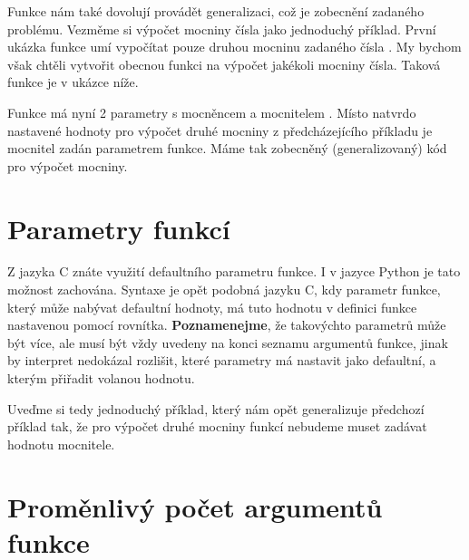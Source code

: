 Funkce nám také dovolují provádět generalizaci, což je zobecnění zadaného problému.
Vezměme si výpočet mocniny čísla jako jednoduchý příklad. První ukázka funkce  umí
vypočítat pouze druhou mocninu zadaného čísla . My bychom však chtěli vytvořit obecnou
funkci na výpočet jakékoli mocniny čísla. Taková funkce je v ukázce níže.


Funkce  má nyní 2 parametry s mocněncem  a mocnitelem . Místo
natvrdo nastavené hodnoty  pro výpočet druhé mocniny z předcházejícího příkladu je mocnitel
zadán parametrem funkce. Máme tak zobecněný (generalizovaný) kód pro výpočet mocniny.

\section{Parametry funkcí}

Z jazyka C znáte využití defaultního parametru funkce. I v jazyce Python je tato možnost zachována.
Syntaxe je opět podobná jazyku C, kdy parametr funkce, který může nabývat defaultní hodnoty, má
tuto hodnotu v definici funkce nastavenou pomocí rovnítka.
\textbf{Poznamenejme}, že takovýchto parametrů
může být více, ale musí být vždy uvedeny na konci seznamu argumentů funkce, jinak by interpret
nedokázal rozlišit, které parametry má nastavit jako defaultní, a kterým přiřadit volanou hodnotu.

Uveďme si tedy jednoduchý příklad, který nám opět generalizuje předchozí příklad tak, že pro výpočet
druhé mocniny funkcí  nebudeme muset zadávat hodnotu mocnitele.



\section{Proměnlivý počet argumentů funkce}

